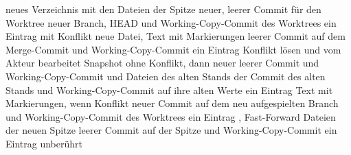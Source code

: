 \startplacetable[title={Was die Schritte der Sitzung ändern},
  reference=tab:phase3-workflow-effects,location=split]
\startxtable[frame=off,split=yes,option=stretch]
\startxtablehead
\startxrow[topframe=on,bottomframe=on]
 \stopxcell
{} \stopxcell
{} \stopxcell
{} \stopxcell
{} \stopxcell
\stopxrow
\stopxtablehead
\startxtablenext
\startxrow[topframe=on,bottomframe=on]
 \stopxcell
{} \stopxcell
{} \stopxcell
{} \stopxcell
{} \stopxcell
\stopxrow
\stopxtablenext
\startxrow
\startxcell {} \stopxcell
\startxcell neues Verzeichnis mit den Dateien der Spitze \stopxcell
\startxcell neuer, leerer Commit für den Worktree \stopxcell
\startxcell neuer Branch, HEAD und Working-Copy-Commit des Worktrees \stopxcell
\startxcell ein Eintrag  \stopxcell
\stopxrow
\startxrow
\startxcell {} mit Konflikt \stopxcell
\startxcell neue Datei, Text mit Markierungen \stopxcell
\startxcell leerer Commit auf dem Merge-Commit \stopxcell
\startxcell {} und Working-Copy-Commit \stopxcell
\startxcell ein Eintrag  \stopxcell
\stopxrow
\startxrow
\startxcell Konflikt lösen und  \stopxcell
\startxcell vom Akteur bearbeitet \stopxcell
\startxcell Snapshot ohne Konflikt, dann neuer leerer Commit \stopxcell
\startxcell {} und Working-Copy-Commit \stopxcell
\startxcell {} und  \stopxcell
\stopxrow
\startxrow
\startxcell {} \stopxcell
\startxcell Dateien des alten Stands \stopxcell
\startxcell der Commit des alten Stands \stopxcell
\startxcell {} und Working-Copy-Commit auf ihre alten Werte \stopxcell
\startxcell ein Eintrag  \stopxcell
\stopxrow
\startxrow
\startxcell {} \stopxcell
\startxcell Text mit Markierungen, wenn Konflikt \stopxcell
\startxcell neuer Commit auf dem neu aufgespielten \stopxcell
\startxcell Branch und Working-Copy-Commit des Worktrees \stopxcell
\startxcell ein Eintrag  \stopxcell
\stopxrow
\startxrow
\startxcell {}, Fast-Forward \stopxcell
\startxcell Dateien der neuen Spitze \stopxcell
\startxcell leerer Commit auf der Spitze \stopxcell
\startxcell {} und Working-Copy-Commit \stopxcell
\startxcell ein Eintrag  \stopxcell
\stopxrow
\startxrow
\startxcell {} \stopxcell
\startxcell unberührt \stopxcell
